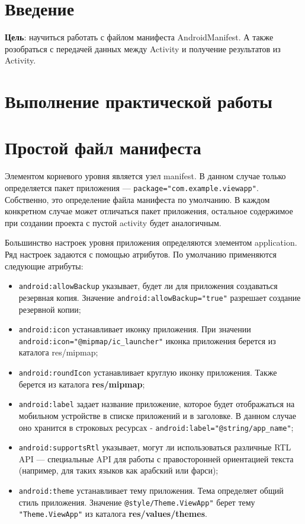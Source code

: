 \graphicspath{{./seventh/img}}

\section*{\LARGE{Введение}}
\textbf{Цель}: научиться работать с файлом манифеста AndroidManifest.
А также розобраться с передачей данных между Activity и получение
результатов из Activity.\par

\clearpage

\section*{\LARGE{Выполнение практической работы}}

\section{Простой файл манифеста}
Элементом корневого уровня является узел manifest. В данном случае только
определяется пакет приложения --- \texttt{package="com.example.viewapp"}.
Собственно, это определение файла манифеста по умолчанию. В каждом
конкретном случае может отличаться пакет приложения, остальное
содержимое при создании проекта с пустой activity будет аналогичным.\par
Большинство настроек уровня приложения определяются элементом
application. Ряд настроек задаются с помощью атрибутов. По умолчанию
применяются следующие атрибуты:
\begin{itemize}
	\item \texttt{android:allowBackup} указывает, будет ли для приложения
		создаваться резервная копия. Значение
		\texttt{android:allowBackup="true"} разрешает создание
		резервной копии;
	\item \texttt{android:icon} устанавливает иконку приложения.
		При значении \texttt{android:icon="@mipmap/ic\_launcher"} иконка
		приложения берется из каталога res/mipmap;
	\item \texttt{android:roundIcon} устанавливает круглую иконку приложения.
		Также берется из каталога \textbf{res/mipmap};
	\item \texttt{android:label} задает название приложение, которое будет
		отображаться на мобильном устройстве в списке приложений и в
		заголовке. В данном случае оно хранится в строковых ресурсах -
		\texttt{android:label="@string/app\_name"};
	\item \texttt{android:supportsRtl} указывает, могут ли использоваться
		различные RTL API --- специальные API для работы с правосторонней
		ориентацией текста (например, для таких языков
		как арабский или фарси);
	\item \texttt{android:theme} устанавливает тему приложения.
		Тема определяет общий стиль приложения. Значение
		\texttt{@style/Theme.ViewApp"} берет тему \texttt{"Theme.ViewApp"} из
		каталога \textbf{res/values/themes}.
\end{itemize}

